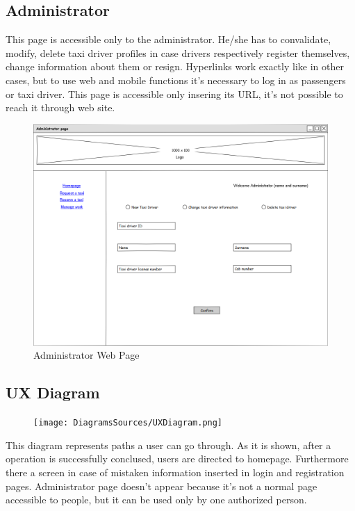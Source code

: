 \subsection{Administrator}
This page is accessible only to the administrator. He/she has to convalidate, modify, delete taxi driver profiles in case drivers respectively register themselves, change information about them or resign. \newline Hyperlinks work exactly like in other cases, but to use web and mobile functions it's necessary to log in as passengers or taxi driver. This page is accessible only insering its URL, it's not possible to reach it through web site.
\begin{figure}[H]
\centering
\includegraphics[scale=0.35]{mockups/administrator.png}
\caption{Administrator Web Page}
\end{figure}
\subsection{UX Diagram}
\begin{figure} [H]
\centering
\texttt{[image: DiagramsSources/UXDiagram.png]}
\end{figure}
This diagram represents paths a user can go through. As it is shown, after a operation is successfully conclused, users are directed to homepage. Furthermore there a screen in case of mistaken information inserted in login and registration pages. \newline Administrator page doesn't appear because it's not a normal page accessible to people, but it can be used only by one authorized person.